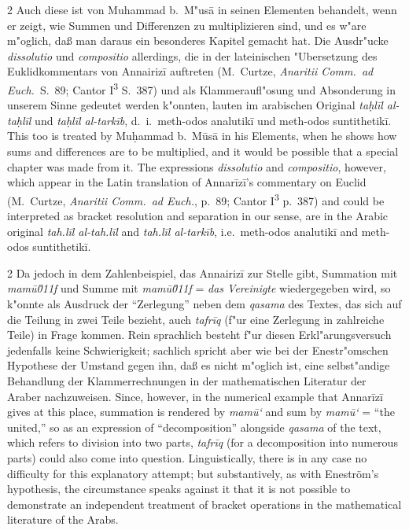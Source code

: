 \documentclass[10pt,a4paper]{article}
\renewcommand{\switchcolumn}{\syncronize\nointerlineskip\columnbreak}
\newcommand{\begingreek}{\bgroup\greekfont}
\newcommand{\closegreek}{\egroup}
\newcommand{\enquote}[1]{``#1''}
\begin{document}
\begin{paracol}{2}
Auch diese ist von Muhammad b.\ M"us\=a in seinen Elementen behandelt, wenn er zeigt, wie Summen und Differenzen zu multiplizieren sind, und es w"are m"oglich, da\ss{} man daraus ein besonderes Kapitel gemacht hat. Die Ausdr"ucke \textit{dissolutio} und \textit{compositio} allerdings, die in der lateinischen "Ubersetzung des Euklidkommentars von Annairiz\=i{} auftreten (M.\ Curtze, \textit{Anaritii Comm.\ ad Euch.}\ S.\ 89; Cantor I\textsuperscript{3} S.\ 387) und als Klammeraufl"osung und Absonderung in unserem Sinne gedeutet werden k"onnten, lauten im arabischen Original \textit{ta\d{h}l\={i}l al-ta\d{h}l\={i}l} und \textit{ta\d{h}l\={i}l al-tark\={i}b}, d.\ i.\ \begingreek meth-odos analutik\=i \closegreek und \begingreek meth-odos suntithetik\=i.\closegreek
\switchcolumn
This too is treated by Mu\d{h}ammad b.\ M\=us\=a in his Elements, when he shows how sums and differences are to be multiplied, and it would be possible that a special chapter was made from it. The expressions \textit{dissolutio} and \textit{compositio}, however, which appear in the Latin translation of Annar\={i}z\={i}'s commentary on Euclid (M.\ Curtze, \textit{Anaritii Comm.\ ad Euch.}, p.\ 89; Cantor I\textsuperscript{3} p.\ 387) and could be interpreted as bracket resolution and separation in our sense, are in the Arabic original \textit{tah.l\={i}l al-tah.l\={i}l} and \textit{tah.l\={i}l al-tark\={i}b}, i.e.\ \begingreek meth-odos analutik\=i \closegreek and \begingreek meth-odos suntithetik\=i.\closegreek
\end{paracol}

\begin{paracol}{2}
Da jedoch in dem Zahlenbeispiel, das Annairiz\=i{} zur Stelle gibt, Summation mit \textit{mam\=u\u011f} und Summe mit \textit{mam\=u\u011f} = \textit{das Vereinigte} wiedergegeben wird, so k"onnte als Ausdruck der \enquote{Zerlegung} neben dem \textit{qasama} des Textes, das sich auf die Teilung in zwei Teile bezieht, auch \textit{tafr\={i}q} (f"ur eine Zerlegung in zahlreiche Teile) in Frage kommen. Rein sprachlich besteht f"ur diesen Erkl"arungsversuch jedenfalls keine Schwierigkeit; sachlich spricht aber wie bei der Enestr"omschen Hypothese der Umstand gegen ihn, da\ss{} es nicht m"oglich ist, eine selbst"andige Behandlung der Klammerrechnungen in der mathematischen Literatur der Araber nachzuweisen.
\switchcolumn
Since, however, in the numerical example that Annar\={i}z\={i} gives at this place, summation is rendered by \textit{mam\=u`} and sum by \textit{mam\=u`} = ``the united,'' so as an expression of ``decomposition'' alongside \textit{qasama} of the text, which refers to division into two parts, \textit{tafr\={i}q} (for a decomposition into numerous parts) could also come into question. Linguistically, there is in any case no difficulty for this explanatory attempt; but substantively, as with Enestr\"om's hypothesis, the circumstance speaks against it that it is not possible to demonstrate an independent treatment of bracket operations in the mathematical literature of the Arabs.
\end{paracol}
\clearpage
\end{document}

